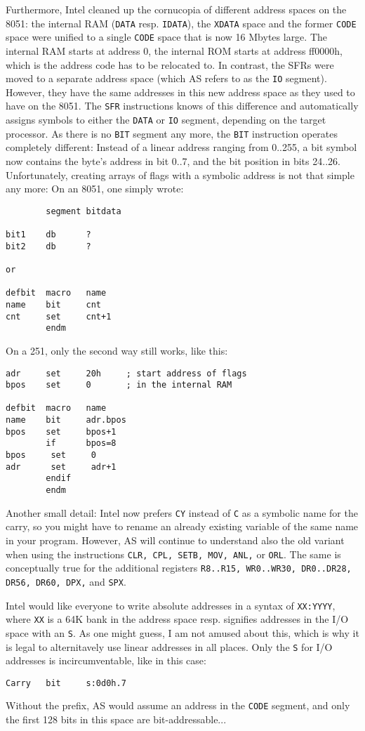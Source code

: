 \documentclass[12pt,twoside]{report}
\newcommand{\tty}[1]{{\tt #1}}
\begin{document}
Furthermore, Intel cleaned up the cornucopia of different address
spaces on the 8051: the internal RAM (\tty{DATA} resp. \tty{IDATA}), the
\tty{XDATA} space and the former \tty{CODE} space were unified to a single
\tty{CODE} space that is now 16 Mbytes large.  The internal RAM starts at
address 0, the internal ROM starts at address ff0000h, which is the
address code has to be relocated to.  In contrast, the SFRs were moved to
a separate address space (which AS refers to as the \tty{IO} segment). 
However, they have the same addresses in this new address space as they
used to have on the 8051.  The \tty{SFR} instructions knows of this
difference and automatically assigns symbols to either the \tty{DATA} or
\tty{IO} segment, depending on the target processor.  As there is no
\tty{BIT} segment any more, the \tty{BIT} instruction operates completely
different: Instead of a linear address ranging from 0..255, a bit symbol
now contains the byte's address in bit 0..7, and the bit position in bits
24..26.  Unfortunately, creating arrays of flags with a symbolic address
is not that simple any more: On an 8051, one simply wrote:
\begin{verbatim}
        segment bitdata                  

bit1    db      ?                        
bit2    db      ?                        

or

defbit  macro   name
name    bit     cnt
cnt     set     cnt+1
        endm   
\end{verbatim}
On a 251, only the second way still works, like this:
  \begin{verbatim}
adr     set     20h     ; start address of flags
bpos    set     0       ; in the internal RAM

defbit  macro   name
name    bit     adr.bpos
bpos    set     bpos+1
        if      bpos=8
bpos     set     0
adr      set     adr+1
        endif  
        endm
\end{verbatim}
Another small detail: Intel now prefers \tty{CY} instead of \tty{C} as a
symbolic name for the carry, so you might have to rename an already
existing variable of the same name in your program.  However, AS will
continue to understand also the old variant when using the instructions
\tty{CLR, CPL, SETB, MOV, ANL,} or \tty{ORL}.  The same is conceptually
true for the additional registers \tty{R8..R15, WR0..WR30, DR0..DR28, DR56,
DR60, DPX,} and \tty{SPX}.

Intel would like everyone to write absolute addresses in a syntax of
\tty{XX:YYYY}, where \tty{XX} is a 64K bank in the address space resp.
signifies addresses in the I/O space with an \tty{S}.  As one might guess,
I am not amused about this, which is why it is legal to alternitavely use
linear addresses in all places.  Only the \tty{S} for I/O addresses is
incircumventable, like in this case:
\begin{verbatim}
Carry   bit     s:0d0h.7
\end{verbatim}
Without the prefix, AS would assume an address in the \tty{CODE} segment,
and only the first 128 bits in this space are bit-addressable...
\end{document}
